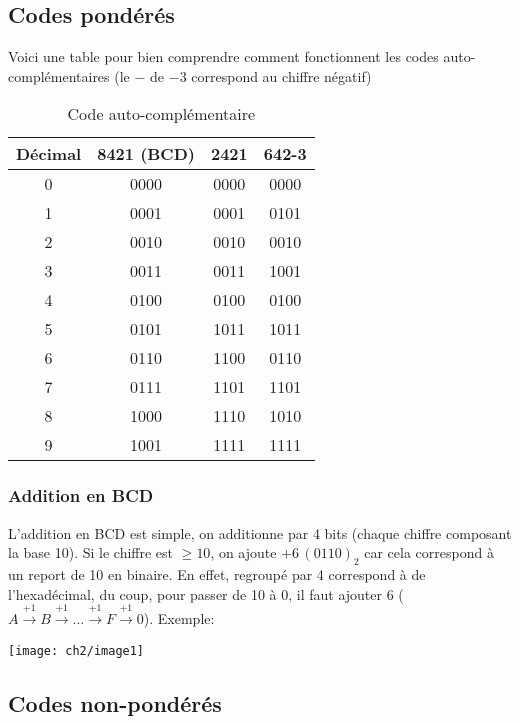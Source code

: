 \subsection{Codes pondérés}
Voici une table pour bien comprendre comment fonctionnent les codes auto-complémentaires (le $-$ de $-3$ correspond au chiffre négatif)
\begin{table}[H]
	\centering
	\begin{tabular}{c|c|c|c}
		Décimal & 8421 (BCD) & 2421 & 642-3 \\
		\hline
		0 & 0000 & 0000 & 0000\\
		\hline
		1 & 0001 & 0001 & 0101\\
		\hline
		2 & 0010 & 0010 & 0010\\
		\hline
		3 & 0011 & 0011 & 1001\\
		\hline
		4 & 0100 & 0100 & 0100\\
		\hline
		5 & 0101 & 1011 & 1011\\
		\hline
		6 & 0110 & 1100 & 0110\\
		\hline
		7 & 0111 & 1101 & 1101\\
		\hline
		8 & 1000 & 1110 & 1010\\
		\hline
		9 & 1001 & 1111 & 1111		
	\end{tabular}
	\caption{Code auto-complémentaire}
\end{table}
\subsubsection{Addition en BCD}
L'addition en BCD est simple, on additionne par 4 bits (chaque chiffre composant la base 10). Si le chiffre est $\geq 10$, on ajoute $+6\,(0110)_2$ car cela correspond à un report de 10 en binaire. En effet, regroupé par 4 correspond à de l'hexadécimal, du coup, pour passer de 10 à 0, il faut ajouter 6 ($A\overset{+1}{\rightarrow}B\overset{+1}{\rightarrow}\dots\overset{+1}{\rightarrow}F\overset{+1}{\rightarrow}0$). Exemple:
\begin{table}[H]
	\centering
	\texttt{[image: ch2/image1]}
\end{table}
\subsection{Codes non-pondérés}
